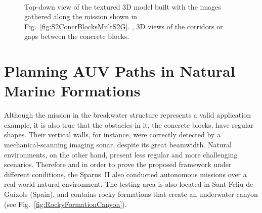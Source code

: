 \begin{figure}[htbp]
\myfloatalign
	\\
	\quad
\caption[3D reconstruction built from images gathered along the autonomous
mission presented in Fig.~\ref{fig:S2ConcrBlocksMultS2G}.] 
{\protect {} Top-down view of the textured 3D model built
with the images gathered along the mission shown in
Fig.~\ref{fig:S2ConcrBlocksMultS2G}.
\protect {},\protect
{} 3D views of the corridors or gaps
between the concrete blocks.}
\label{fig:Breakwater3DReconstruction}
\end{figure}

\section{Planning AUV Paths in Natural Marine Formations}

Although the mission in the breakwater structure represents a valid
application example, it is also true that the obstacles in it, \ie the concrete
blocks, have regular shapes. Their vertical walls, for instance, were correctly
detected by a mechanical-scanning imaging sonar, despite its great beamwidth.
Natural environments, on the other hand, present less regular and more
challenging scenarios. Therefore and in order to prove the proposed framework
under different conditions, the Sparus~II also conducted autonomous missions
over a real-world natural environment. The testing area is also located in Sant
Feliu de Gu\'ixols (Spain), and contains rocky formations that create an
underwater canyon (see Fig.~\ref{fig:RockyFormationCanyon}).


